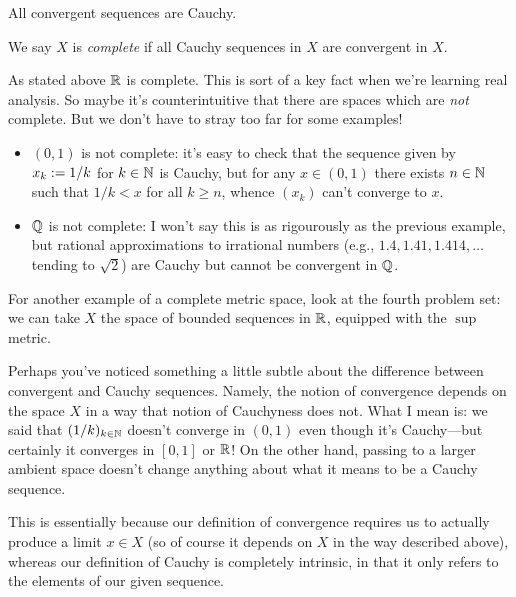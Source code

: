 \begin{exercise}
  \label{convergentcauchy}
  All convergent sequences are Cauchy.
\end{exercise}

\begin{definition}
  We say $X$ is \textit{complete} if all Cauchy sequences in $X$ are
  convergent in $X$.
\end{definition}

\begin{examples}
  As stated above $\mathbb{R}$ is complete. This is sort of a key fact when
  we're learning real analysis. So maybe it's counterintuitive that
  there are spaces which are \textit{not} complete. But we don't have
  to stray too far for some examples!
  \begin{itemize}
  \item $(0,1)$ is not complete: it's easy to check that the sequence
    given by $x_k \mathrel{:=} 1/k$ for $k \in \mathbb{N}$ is Cauchy, but for any
    $x \in (0,1)$ there exists $n \in \mathbb{N}$ such that $1/k < x$ for all
    $k \ge n$, whence $(x_k)$ can't converge to $x$.
  \item $\mathbb{Q}$ is not complete: I won't say this is as rigourously as
    the previous example, but rational approximations to irrational
    numbers (e.g., $1.4, 1.41, 1.414, \ldots$ tending to $\sqrt 2$)
    are Cauchy but cannot be convergent in $\mathbb{Q}$.
  \end{itemize}
  For another example of a complete metric space, look at the fourth
  problem set: we can take $X$ the space of bounded sequences in $\mathbb{R}$,
  equipped with the $\sup$ metric.
\end{examples}

\begin{nothing}
  Perhaps you've noticed something a little subtle about the
  difference between convergent and Cauchy sequences. Namely, the
  notion of convergence depends on the space $X$ in a way that notion
  of Cauchyness does not. What I mean is: we said that $(1/k)_{k \in
    \mathbb{N}}$ doesn't converge in $(0,1)$ even though it's Cauchy---but
  certainly it converges in $[0, 1]$ or $\mathbb{R}$! On the other hand,
  passing to a larger ambient space doesn't change anything about what
  it means to be a Cauchy sequence.

  This is essentially because our definition of convergence requires
  us to actually produce a limit $x \in X$ (so of course it depends on
  $X$ in the way described above), whereas our definition of Cauchy is
  completely intrinsic, in that it only refers to the elements of our
  given sequence.
\end{nothing}

